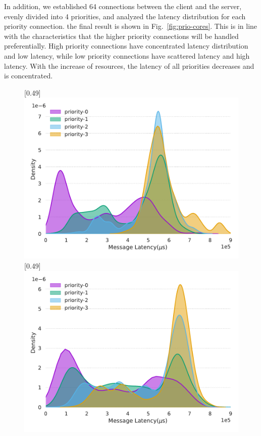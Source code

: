 \documentclass[sigconf,review,anonymous]{acmart}
\providecommand{\DIFaddbeginFL}{} %
\providecommand{\DIFaddendFL}{} %
\providecommand{\DIFdelbeginFL}{} %
\providecommand{\DIFdelendFL}{} %
\begin{document}
In addition, we established 64 connections between the client and the server, evenly divided into 4 priorities, and analyzed the latency distribution for each priority connection. the final result is shown in Fig.~\ref{fig:prio-cores}. This is in line with the characteristics that the higher priority connections will be handled preferentially. High priority connections have concentrated latency distribution and low latency, while low priority connections have scattered latency and high latency. With the increase of resources, the latency of all priorities decreases and is concentrated.

\begin{figure}[ht]
    \centering
    \DIFdelbeginFL %
\DIFdelendFL \DIFaddbeginFL {}[0.49\linewidth]
    \DIFaddendFL {
      \includegraphics[width=\linewidth]{assets/prio-core2.pdf}
    }
    \DIFdelbeginFL %
\DIFdelendFL \DIFaddbeginFL {}[0.49\linewidth]
    \DIFaddendFL {
      \includegraphics[width=\linewidth]{assets/prio-core4.pdf}
}
\end{figure}
\end{document}
